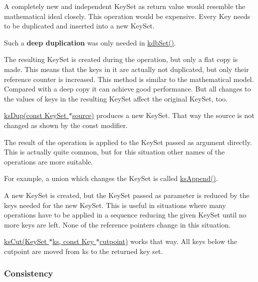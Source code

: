 \begin{DoxyItemize}
\item A completely new and independent {\ttfamily Key\+Set} as return value would resemble the mathematical ideal closely. This operation would be expensive. Every {\ttfamily Key} needs to be duplicated and inserted into a new {\ttfamily Key\+Set}.

Such a {\bfseries deep duplication} was only needed in {\ttfamily \hyperlink{group__kdb_ga11436b058408f83d303ca5e996832bcf}{kdb\+Set()}}.
\item The resulting {\ttfamily Key\+Set} is created during the operation, but only a flat copy is made. This means that the keys in it are actually not duplicated, but only their reference counter is increased. This method is similar to the mathematical model. Compared with a deep copy it can achieve good performance. But all changes to the values of keys in the resulting {\ttfamily Key\+Set} affect the original {\ttfamily Key\+Set}, too.

{\ttfamily \hyperlink{group__keyset_gac59e4b328245463f1451f68d5106151c}{ks\+Dup(const Key\+Set $\ast$source)}} produces a new {\ttfamily Key\+Set}. That way the {\ttfamily source} is not changed as shown by the {\ttfamily const} modifier.
\item The result of the operation is applied to the {\ttfamily Key\+Set} passed as argument directly. This is actually quite common, but for this situation other names of the operations are more suitable.

For example, a union which changes the {\ttfamily Key\+Set} is called {\ttfamily \hyperlink{group__keyset_ga21eb9c3a14a604ee3a8bdc779232e7b7}{ks\+Append()}}.
\item A new {\ttfamily Key\+Set} is created, but the {\ttfamily Key\+Set} passed as parameter is reduced by the keys needed for the new {\ttfamily Key\+Set}. This is useful in situations where many operations have to be applied in a sequence reducing the given {\ttfamily Key\+Set} until no more keys are left. None of the reference pointers change in this situation.

{\ttfamily \hyperlink{group__keyset_ga6b00cf82b59af4d883a9bad6cf4a4a4a}{ks\+Cut(\+Key\+Set $\ast$ks, const Key $\ast$cutpoint)}} works that way. All keys below the {\ttfamily cutpoint} are moved from {\ttfamily ks} to the returned key set.
\end{DoxyItemize}

\subsubsection*{Consistency}


